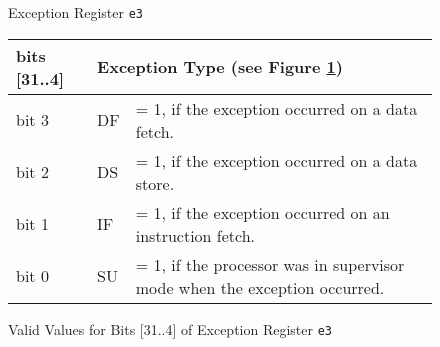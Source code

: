 \begin{figure}[hpt]
\caption{\label{e3-table} Exception Register {\tt e3}}

\begin{center}
\begin{tabular}{|l|lp{3.5in}|}
\hline

bits [31..4]	& \multicolumn{2}{|l|}{Exception Type
			(see Figure \ref{exceptions-table})}\\
\hline

bit 3		&DF	&= 1, if the exception occurred on a data fetch.\\
\hline
bit 2		&DS	&= 1, if the exception occurred on a data store.\\
\hline
bit 1		&IF	&= 1, if the exception occurred on an instruction fetch.\\
\hline
bit 0		&SU	&= 1, if the processor was in supervisor mode when the exception occurred.\\
\hline
\end{tabular}
\end{center}


\caption{\label{exceptions-table}
	Valid Values for Bits [31..4] of Exception Register {\tt e3}}


\end{figure}
